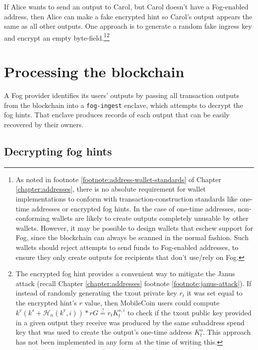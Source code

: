 If Alice wants to send an output to Carol, but Carol doesn't have a Fog-enabled address, then Alice can make a fake encrypted hint so Carol's output appears the same as all other outputs. One approach is to generate a random fake ingress key and encrypt an empty byte-field.\footnote{As noted in footnote \ref{footnote:address-wallet-standards} of Chapter \ref{chapter:addresses}, there is no absolute requirement for wallet implementations to conform with transaction-construction standards like one-time addresses or encrypted fog hints. In the case of one-time addresses, non-conforming wallets are likely to create outputs completely unusable by other wallets. However, it may be possible to design wallets that eschew support for Fog, since the blockchain can always be scanned in the normal fashion. Such wallets should reject attempts to send funds to Fog-enabled addresses, to ensure they only create outputs for recipients that don't use/rely on Fog.}\footnote{\label{footnote:fog-hint-janus-mitigation}The encrypted fog hint provides a convenient way to mitigate the Janus attack (recall Chapter \ref{chapter:addresses} footnote \ref{footnote:janus-attack}). If instead of randomly generating the txout private key $r_t$ it was set equal to the encrypted hint's $r$ value, then MobileCoin users could compute $k^v(k^s + \mathcal{H}_n(k^v,i))*r G \stackrel{?}{=} r_t K^{s,i}_t$ to check if the txout public key provided in a given output they receive was produced by the same subaddress spend key that was used to create the output's one-time address $K^o_t$. This approach has not been implemented in any form at the time of writing this.}



\section{Processing the blockchain}
\label{sec:fog-processing-blockchain}

A Fog provider identifies its users' outputs by passing all transaction outputs from the blockchain into a {\tt fog-ingest} enclave, which attempts to decrypt the fog hints. That enclave produces records of each output that can be easily recovered by their owners.


\subsection{Decrypting fog hints}
\label{subsec:fog-decrypting-hints}

